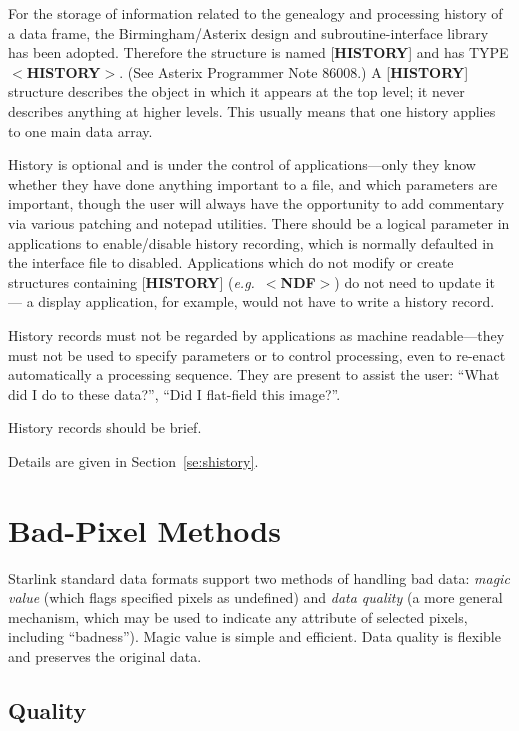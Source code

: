 \documentclass[twoside,11pt]{article}
\newcommand{\htmlref}[2]{#1}
\newcommand{\html}[1]{}
\newcommand{\latex}[1]{#1}
\newcommand{\xlabel}[1]{}
\renewcommand{\_}{\texttt{\symbol{95}}}
\begin{document}
For the storage of information related to the genealogy and
processing history of a data frame, the
Birmingham/Asterix design and subroutine-interface library
has been adopted.  Therefore the structure is named
{[}{\bf HISTORY}{]} and has TYPE $<${\bf HISTORY}$>$.  (See
Asterix Programmer Note 86\_008.)
A {[}{\bf HISTORY}{]} structure describes
the object in which it appears at the top level;
it never describes anything at higher levels.
This usually means that one history applies to one
main data array.

History is optional and is under the control of applications---only
they know whether they have done anything important to a file, and which
parameters are important, though the user will always
have the opportunity to add commentary via various patching
and notepad utilities.  There
should be a logical parameter in applications to enable/disable history
recording, which is normally defaulted in the interface file to
disabled.  Applications which do not modify or create structures containing
{[}{\bf HISTORY}{]} ({\it e.g.}\
$<${\bf NDF}$>$) do not need to update it ---
a display
application, for example, would not have to write a history
record.

History records must not be regarded by applications as
machine readable---they must not be used to specify parameters
or to control processing, even to re-enact automatically
a processing sequence.  They are present to assist the user:
``What did I do to these data?'', ``Did I flat-field this image?''.

History records should be brief.

Details are given in \latex{Section~\ref{se:shistory}.}\html{\htmlref{$<${\bf HISTORY}$>$
Structure.}{se:history}}

\section{\xlabel{se_badpixel}Bad-Pixel Methods\label{se:badpixel}}

Starlink standard data formats support two
methods of handling bad data: {\it magic value} (which
flags specified pixels as undefined)
and {\it data quality} (a more general mechanism, which may
be used to indicate any attribute of selected pixels, including
``badness'').  Magic value is simple
and efficient.  Data quality
is flexible and preserves the original data.

\subsection{\xlabel{se_quality}Quality\label{se:quality}}
\end{document}
